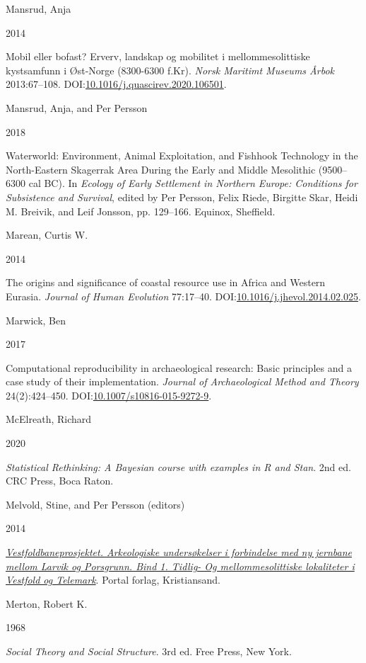 \documentclass[
  a4paper,
  oneside]{uiophdthesis}
\newlength{\cslhangindent}
\newlength{\csllabelwidth}
\newlength{\cslentryspacingunit} %
\newenvironment{CSLReferences}[2] %
 {%
  \setlength{\parindent}{0pt}
  \ifodd #1
  \let\oldpar\par
  \def\par{\hangindent=\cslhangindent\oldpar}
  \fi
  \setlength{\parskip}{#2\cslentryspacingunit}
 }%
 {}
\newcommand{\CSLBlock}[1]{#1\hfill\break}
\newcommand{\CSLLeftMargin}[1]{\parbox[t]{\csllabelwidth}{#1}}
\newcommand{\CSLRightInline}[1]{\parbox[t]{\linewidth - \csllabelwidth}{#1}\break}
\begin{document}
\begin{CSLReferences}{0}{0}
\leavevmode{}%
\CSLBlock{Mansrud, Anja}
\CSLLeftMargin{ 2014}
\CSLRightInline{{Mobil eller bofast? Erverv, landskap og mobilitet i mellommesolittiske kystsamfunn i Øst-Norge (8300-6300 f.Kr)}. \emph{Norsk Maritimt Museums Årbok} 2013:67--108. DOI:\href{https://doi.org/10.1016/j.quascirev.2020.106501}{10.1016/j.quascirev.2020.106501}.}

\leavevmode{}%
\CSLBlock{Mansrud, Anja, and Per Persson}
\CSLLeftMargin{ 2018}
\CSLRightInline{{Waterworld: Environment, Animal Exploitation, and Fishhook Technology in the North-Eastern Skagerrak Area During the Early and Middle Mesolithic (9500--6300 cal BC)}. In \emph{{Ecology of Early Settlement in Northern Europe: Conditions for Subsistence and Survival}}, edited by Per Persson, Felix Riede, Birgitte Skar, Heidi M. Breivik, and Leif Jonsson, pp. 129--166. Equinox, Sheffield.}

\leavevmode{}%
\CSLBlock{Marean, Curtis W.}
\CSLLeftMargin{ 2014}
\CSLRightInline{The origins and significance of coastal resource use in Africa and Western Eurasia. \emph{Journal of Human Evolution} 77:17--40. DOI:\href{https://doi.org/10.1016/j.jhevol.2014.02.025}{10.1016/j.jhevol.2014.02.025}.}

\leavevmode{}%
\CSLBlock{Marwick, Ben}
\CSLLeftMargin{ 2017}
\CSLRightInline{Computational reproducibility in archaeological research: Basic principles and a case study of their implementation. \emph{Journal of Archaeological Method and Theory} 24(2):424--450. DOI:\href{https://doi.org/10.1007/s10816-015-9272-9}{10.1007/s10816-015-9272-9}.}

\leavevmode{}%
\CSLBlock{McElreath, Richard}
\CSLLeftMargin{ 2020}
\CSLRightInline{\emph{{Statistical Rethinking: A Bayesian course with examples in R and Stan}}. 2nd ed. CRC Press, Boca Raton.}

\leavevmode{}%
\CSLBlock{Melvold, Stine, and Per Persson (editors)}
\CSLLeftMargin{ 2014}
\CSLRightInline{\emph{\href{https://doi.org/10.23865/noasp.61}{{Vestfoldbaneprosjektet. Arkeologiske undersøkelser i forbindelse med ny jernbane mellom Larvik og Porsgrunn. Bind 1. Tidlig- Og mellommesolittiske lokaliteter i Vestfold og Telemark}}}. Portal forlag, Kristiansand.}

\leavevmode{}%
\CSLBlock{Merton, Robert K.}
\CSLLeftMargin{ 1968}
\CSLRightInline{\emph{{Social Theory and Social Structure}}. 3rd ed. Free Press, New York.}


\end{CSLReferences}
\end{document}
